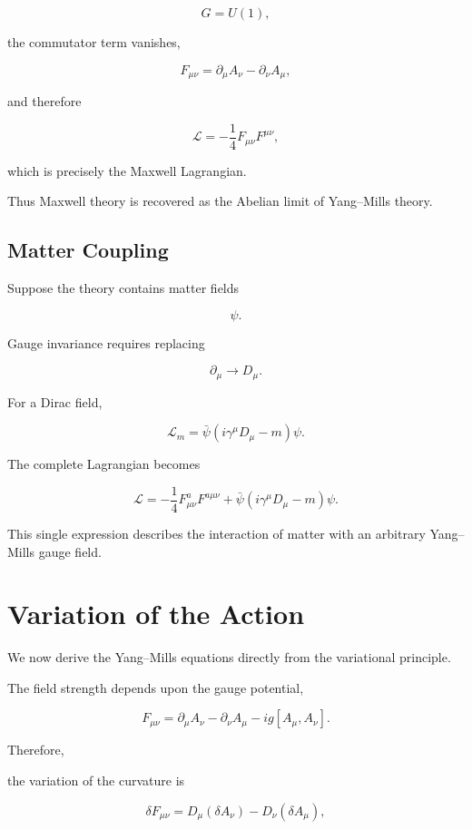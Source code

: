\[
G=U(1),
\]

the commutator term vanishes,

\[
F_{\mu\nu}
=
\partial_\mu A_\nu
-
\partial_\nu A_\mu,
\]

and therefore

\[
\boxed{
\mathcal L
=
-\frac14
F_{\mu\nu}
F^{\mu\nu},
}
\]

which is precisely the Maxwell Lagrangian.

Thus Maxwell theory is recovered as the Abelian limit of Yang--Mills
theory.


\subsection{Matter Coupling}

Suppose the theory contains matter fields

\[
\psi.
\]

Gauge invariance requires replacing

\[
\partial_\mu
\rightarrow
D_\mu.
\]

For a Dirac field,

\[
\boxed{
\mathcal L_m
=
\bar\psi
(i\gamma^\mu D_\mu-m)
\psi.
}
\]

The complete Lagrangian becomes

\[
\boxed{
\mathcal L
=
-\frac14
F_{\mu\nu}^aF^{a\mu\nu}
+
\bar\psi
(i\gamma^\mu D_\mu-m)
\psi.
}
\]

This single expression describes the interaction of matter with an
arbitrary Yang--Mills gauge field.


\section{Variation of the Action}

We now derive the Yang--Mills equations directly from the variational
principle.

The field strength depends upon the gauge potential,

\[
F_{\mu\nu}
=
\partial_\mu A_\nu
-
\partial_\nu A_\mu
-
ig[A_\mu,A_\nu].
\]

Therefore,

the variation of the curvature is

\[
\delta F_{\mu\nu}
=
D_\mu(\delta A_\nu)
-
D_\nu(\delta A_\mu),
\]


